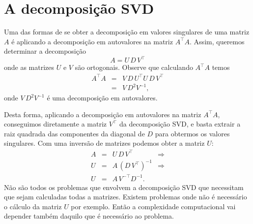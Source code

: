 \documentclass[a4paper,12pt,oneside,onecolumn,final,fleqn]{repUERJ}
\begin{document}
%
%

\section{A decomposição SVD}
Uma das formas de se obter a decomposição em valores singulares de uma matriz $A$ é aplicando a decomposição em autovalores na matriz  $A^\top A$. Assim, queremos determinar a decomposição
\begin{equation*}
A=U\,D\,V^\top
\end{equation*} 
onde as matrizes $U$ e $V$ são ortogonais. Observe que calculando $A^\top A$ temos
\begin{equation*}
\begin{array}{rcl}
A^\top A&=&V\,D\,U^\top U\,D\,V^\top\\
&=&V\,D^2 V^{-1},
\end{array}
\end{equation*}
onde $V\,D^2 V^{-1}$ é uma decomposição em autovalores.

Desta forma, aplicando a decomposição em autovalores na matriz $A^\top A$, conseguimos diretamente a matriz $V^\top$ da decomposição SVD, e basta extrair a raiz quadrada das componentes da diagonal de $D$ para obtermos os valores singulares. Com uma inversão de matrizes podemos obter a matriz $U$:
\begin{equation*}
\begin{array}{rcll}
A&=&U\,D\,V^\top &\Rightarrow\\
U&=&A\,(D\,V^\top)^{-1} &\Rightarrow\\
U&=&A\,V^{-\top}D^{-1}.
\end{array}
\end{equation*}
Não são todos os problemas que envolvem a decomposição SVD que necessitam que sejam calculadas todas a matrizes. Existem problemas onde não é necessário o cálculo da matriz $U$ por exemplo. Então a complexidade computacional vai depender também daquilo que é necessário ao problema.
\end{document}
